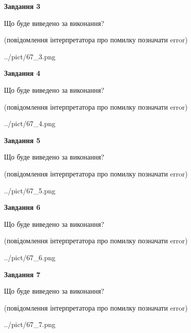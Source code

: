 \documentclass[12pt, ukrainian]{article}
\begin{document}
{\begin {large}
{\begin {center}\textbf{Завдання 3}\end {center}}\par
Що буде виведено за виконання?\par
 (повідомлення інтерпретатора про помилку позначати error)\par
\begin{center}
	{../pict/67_3.png}
\end{center}
\newpage

{\begin {center}\textbf{Завдання 4}\end {center}}\par
Що буде виведено за виконання?\par
 (повідомлення інтерпретатора про помилку позначати error)\par
\begin{center}
	{../pict/67_4.png}
\end{center}
\newpage

{\begin {center}\textbf{Завдання 5}\end {center}}\par
Що буде виведено за виконання?\par
 (повідомлення інтерпретатора про помилку позначати error)\par
\begin{center}
	{../pict/67_5.png}
\end{center}
\newpage

{\begin {center}\textbf{Завдання 6}\end {center}}\par
Що буде виведено за виконання?\par
 (повідомлення інтерпретатора про помилку позначати error)\par
\begin{center}
	{../pict/67_6.png}
\end{center}
\newpage

{\begin {center}\textbf{Завдання 7}\end {center}}\par
Що буде виведено за виконання?\par
 (повідомлення інтерпретатора про помилку позначати error)\par
\begin{center}
	{../pict/67_7.png}
\end{center}
\newpage


\end{large}}
\end{document}
